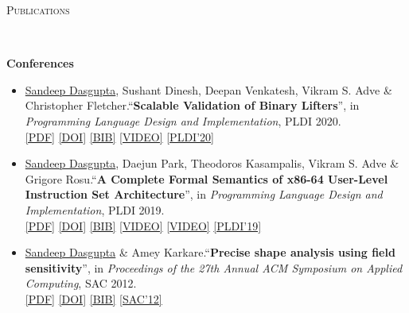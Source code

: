 \documentclass[9pt]{article}
\newenvironment{changemargin}[2]{%
  \begin{list}{}{%
    \setlength{\topsep}{0pt}%
    \setlength{\leftmargin}{#1}%
    \setlength{\rightmargin}{#2}%
    \setlength{\listparindent}{\parindent}%
    \setlength{\itemindent}{\parindent}%
    \setlength{\parsep}{\parskip}%
  }%
  \item[]}{\end{list}
}
\newcommand{\lineover}{
	\begin{changemargin}{-0.05in}{-0.05in}
		\vspace*{-8pt}
		\hrulefill \\
		\vspace*{-2pt}
	\end{changemargin}
}
\newcommand{\header}[1]{
	\begin{changemargin}{-0.5in}{-0.5in}
		\scshape{#1}\\
  	\lineover
	\end{changemargin}
}
\newenvironment{body} {
	\vspace*{-16pt}
	\begin{changemargin}{-0.25in}{-0.5in}
  }	
	{\end{changemargin}
}
\begin{document}
\header{Publications}
\begin{body}
\vspace{14pt}
\textbf{Conferences}\\
	\vspace*{-4pt}
	\begin{itemize} \itemsep -0pt

		\item \underline{Sandeep Dasgupta}, Sushant Dinesh, Deepan Venkatesh, Vikram S. Adve  \& Christopher Fletcher.``\textbf{Scalable Validation of Binary Lifters}'', in \emph{Programming Language Design and Implementation}, PLDI 2020. \\
                \href{https://sdasgup3.github.io/files/pldi_2020.pdf}{[PDF]}
                \href{https://dl.acm.org/doi/abs/10.1145/3385412.3385964}{[DOI]}
                \href{https://sdasgup3.github.io/files/pldi_2020.bib}{[BIB]}
                \href{https://youtu.be/_lLaNmPEwkw?list=PLyrlk8Xaylp5mvxARtX5ncjy9p4X_Ajwd&t=8&t=21s}{[VIDEO]}
                \href{https://pldi20.sigplan.org/}{[PLDI'20]}

		\item \underline{Sandeep Dasgupta}, Daejun Park, Theodoros Kasampalis, Vikram S. Adve  \& Grigore Rosu.``\textbf{A Complete Formal Semantics of x86-64 User-Level
Instruction Set Architecture}'', in \emph{Programming Language Design and Implementation}, PLDI 2019. \\
                \href{https://sdasgup3.github.io/files/pldi_2019.pdf}{[PDF]}
                \href{https://dl.acm.org/citation.cfm?id=3314221.3314601}{[DOI]}
                \href{https://sdasgup3.github.io/files/pldi_2019.bib}{[BIB]}
                \href{https://www.youtube.com/watch?v=eBZtmaNAJwo&t=21s}{[VIDEO]}
                \href{https://www.youtube.com/watch?v=eBZtmaNAJwo&t=21s}{[VIDEO]}
                \href{https://conf.researchr.org/home/pldi-2019}{[PLDI'19]}

		\item \underline{Sandeep Dasgupta} \& Amey Karkare.``\textbf{Precise shape analysis using field sensitivity}'', in \emph{Proceedings of the 27th Annual ACM Symposium on Applied Computing}, SAC 2012. \\
                \href{http://webhost.engr.illinois.edu/~sdasgup3/Document/sac_2012.pdf}{[PDF]}
                \href{http://dx.doi.org/10.1145/2245276.2231982}{[DOI]}
                \href{http://webhost.engr.illinois.edu/~sdasgup3/Document/sac_2012.bib}{[BIB]}
                \href{https://www.sigapp.org/sac/sac2012/}{[SAC'12]}


\end{itemize}
\end{body}
\end{document}
